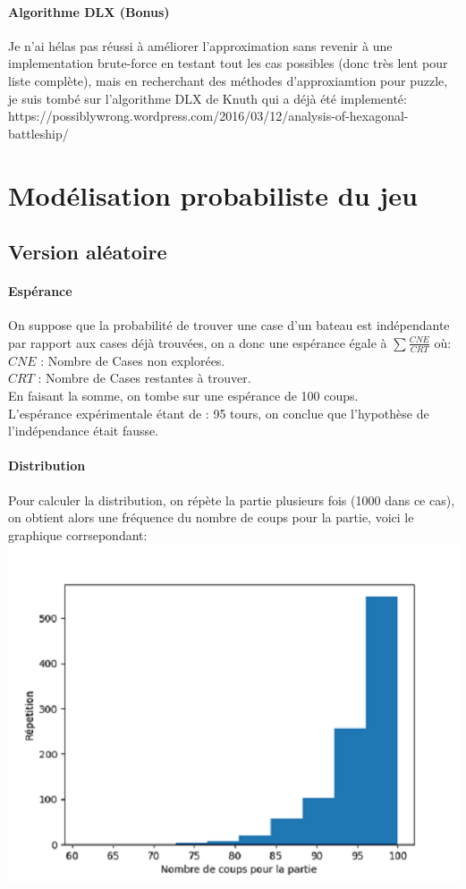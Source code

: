 \documentclass[12pt]{article}
\begin{document}
        \paragraph{Algorithme DLX (Bonus)}
        Je n'ai hélas pas réussi à améliorer l'approximation sans revenir à une implementation brute-force en testant tout les cas possibles (donc très lent pour liste complète), mais en recherchant des méthodes d'approxiamtion pour puzzle, je suis tombé sur l'algorithme DLX de Knuth qui a déjà été implementé:\\
        https://possiblywrong.wordpress.com/2016/03/12/analysis-of-hexagonal-battleship/ 
        
\section{Modélisation probabiliste du jeu}

    \subsection{Version aléatoire}
    \paragraph{Espérance}
    On suppose que la probabilité de trouver une case d'un bateau est indépendante par rapport aux cases déjà trouvées, on a donc une espérance égale à $\sum\frac{CNE}{CRT}$
    où: \\
    $CNE$ : Nombre de Cases non explorées.\\
    $CRT$ : Nombre de Cases restantes à trouver.\\
    En faisant la somme, on tombe sur une espérance de 100 coups.\\
    L'espérance expérimentale étant de : 95 tours, on conclue que l'hypothèse de l'indépendance était fausse.
    \paragraph{Distribution}
    Pour calculer la distribution, on répète la partie plusieurs fois (1000 dans ce cas), on obtient alors une fréquence du nombre de coups pour la partie, voici le graphique corrsepondant:\\ 
    \includegraphics[]{Aleatoire.png}
    
\end{document}

